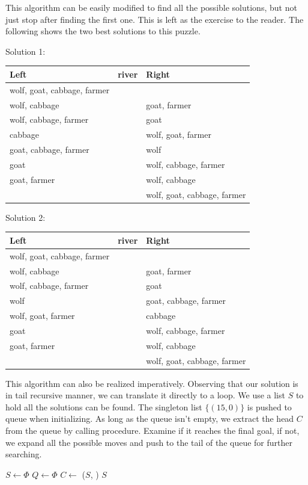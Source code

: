 \documentclass[UTF8]{article}
\begin{document}
This algorithm can be easily modified to find all the possible solutions, but
not just stop after finding the first one. This is left as the exercise to the
reader. The following shows the two best solutions to this puzzle.

Solution 1:

\begin{tabular}{l|c|l}
Left & river & Right \\
\hline
wolf, goat, cabbage, farmer &   & \\
wolf, cabbage &   & goat, farmer \\
wolf, cabbage, farmer &   & goat \\
cabbage &   & wolf, goat, farmer \\
goat, cabbage, farmer &   & wolf \\
goat &   & wolf, cabbage, farmer \\
goat, farmer &   & wolf, cabbage \\
 &  & wolf, goat, cabbage, farmer
\end{tabular}

Solution 2:

\begin{tabular}{l|c|l}
Left & river & Right \\
\hline
 wolf, goat, cabbage, farmer & & \\
 wolf, cabbage & & goat, farmer \\
 wolf, cabbage, farmer & & goat \\
 wolf & & goat, cabbage, farmer \\
 wolf, goat, farmer & & cabbage \\
 goat & & wolf, cabbage, farmer \\
 goat, farmer & & wolf, cabbage \\
 & & wolf, goat, cabbage, farmer
\end{tabular}

This algorithm can also be realized imperatively. Observing that our
solution is in tail recursive manner, we can translate it directly
to a loop. We use a list $S$ to hold all the solutions can be found.
The singleton list $\{(15, 0)\}$ is pushed to queue when initializing.
As long as the queue isn't empty, we extract the head $C$ from the
queue by calling  procedure. Examine if it reaches the
final goal, if not, we expand all the possible moves and push to the
tail of the queue for further searching.

\begin{algorithmic}[1]
  \State $S \gets \Phi$
  \State $Q \gets \Phi$
  \State {}
    \State $C \gets $ 
      \State {}($S$, )
    \Else
          \State {}
        \EndIf
      \EndFor
    \EndIf
  \EndWhile
  \State \Return $S$
\EndFunction
\end{algorithmic}
\end{document}

